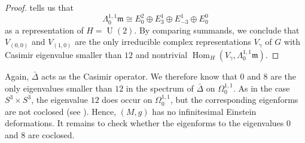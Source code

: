 \documentclass[12pt]{scrartcl}
\theoremstyle{plain}
\theoremstyle{definition}
\newcommand{\Hom}{\operatorname{Hom}}%
\newcommand{\U}{\operatorname{U}}%
\newcommand{\m}{\mathfrak{m}}%
\begin{document}
\begin{proof}
\cite[Lem. 5.8]{hermitianlaplace} tells us that
\[\Lambda^{1,1}_0\m\cong E^2_0\oplus E^1_3\oplus E^1_{−3}\oplus E^0_0\]
as a representation of $H=\U(2)$. By comparing summands, we conclude that $V_{(0,0)}$ and $V_{(1,0)}$ are the only irreducible complex representations $V_\gamma$ of $G$ with Casimir eigenvalue smaller than $12$ and nontrivial $\Hom_H(V_\gamma,\Lambda^{1,1}_0\m)$.
\end{proof}

Again, $\bar\Delta$ acts as the Casimir operator. We therefore know that $0$ and $8$ are the only eigenvalues smaller than $12$ in the spectrum of $\bar\Delta$ on $\Omega^{1,1}_0$. As in the case $S^3\times S^3$, the eigenvalue $12$ does occur on $\Omega^{1,1}_0$, but the corresponding eigenforms are not coclosed (see \cite{hermitianlaplace}). Hence, $(M,g)$ has no infinitesimal Einstein deformations. It remains to check whether the eigenforms to the eigenvalues $0$ and $8$ are coclosed.
\end{document}

